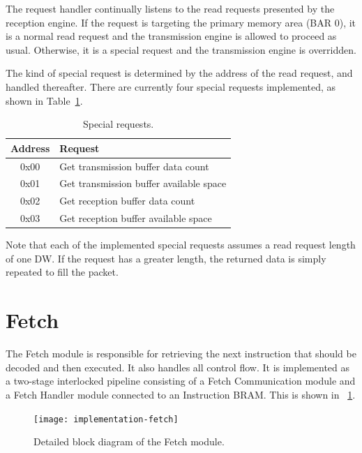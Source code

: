 The request handler continually listens to the read requests presented by the reception engine.
If the request is targeting the primary memory area (BAR 0), it is a normal read request and the transmission engine is allowed to proceed as usual.
Otherwise, it is a special request and the transmission engine is overridden.

The kind of special request is determined by the address of the read request, and handled thereafter.
There are currently four special requests implemented, as shown in Table~\ref{tab:requests}.

\begin{table}[!ht]
    \renewcommand{\arraystretch}{1.3}
    \centering
    \begin{tabular}{c|l}
        \bfseries Address & \bfseries Request \\
        \hline
        0x00 & Get transmission buffer data count \\
        0x01 & Get transmission buffer available space \\
        0x02 & Get reception buffer data count \\
        0x03 & Get reception buffer available space \\
    \end{tabular}
    \caption{Special requests.}
    \label{tab:requests}
\end{table}

Note that each of the implemented special requests assumes a read request length of one DW.
If the request has a greater length, the returned data is simply repeated to fill the packet.


\section{Fetch}

The Fetch module is responsible for retrieving the next instruction that should be decoded and then executed.
It also handles all control flow.
It is implemented as a two-stage interlocked pipeline consisting of a Fetch Communication module and a Fetch Handler module connected to an Instruction BRAM.
This is shown in \figurename~\ref{fig:implementation-fetch}.

\begin{figure}[!ht]
    \centering
    \texttt{[image: implementation-fetch]}
    \caption[Fetch module]{Detailed block diagram of the Fetch module.}
    \label{fig:implementation-fetch}
\end{figure}

